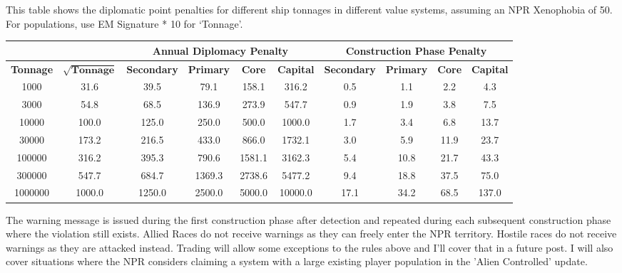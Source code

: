 \documentclass[../Aurora C# unofficial manual.tex]{subfiles}
\begin{document}
	This table shows the diplomatic point penalties for different ship tonnages in different value systems, assuming an NPR Xenophobia of 50. For populations, use EM Signature * 10 for ‘Tonnage’.
	\begin{center}
		\begin{tabular}{|c|c|c|c|c|c|c|c|c|c|}
			\hline
			\multicolumn{2}{|c}{}  & \multicolumn{4}{|c|}{\textbf{Annual Diplomacy Penalty}} & \multicolumn{4}{c|}{\textbf{Construction Phase Penalty}}  \\
			\hline
			\textbf{Tonnage} & \( \sqrt{\textbf{Tonnage}} \) & \textbf{Secondary} & \textbf{Primary} & \textbf{Core} & \textbf{Capital} & \textbf{Secondary} & \textbf{Primary} & \textbf{Core} & \textbf{Capital} \\
			\hline
			1000 & 31.6 & 39.5 & 79.1 & 158.1 & 316.2 & 0.5 & 1.1 & 2.2 & 4.3 \\
			\hline
			3000 & 54.8 & 68.5 & 136.9 & 273.9 & 547.7 & 0.9 & 1.9 & 3.8 & 7.5 \\
			\hline
			10000 & 100.0 & 125.0 & 250.0 & 500.0 & 1000.0 & 1.7 & 3.4 & 6.8 & 13.7 \\
			\hline
			30000 & 173.2 & 216.5 & 433.0 & 866.0 & 1732.1 & 3.0 & 5.9 & 11.9 & 23.7 \\
			\hline
			100000 & 316.2 & 395.3 & 790.6 & 1581.1 & 3162.3 & 5.4 & 10.8 & 21.7 & 43.3 \\
			\hline
			300000 & 547.7 & 684.7 & 1369.3 & 2738.6 & 5477.2 & 9.4 & 18.8 & 37.5 & 75.0 \\
			\hline
			1000000 & 1000.0 & 1250.0 & 2500.0 & 5000.0 & 10000.0 & 17.1 & 34.2 & 68.5 & 137.0 \\
			\hline
		\end{tabular}
	\end{center}
	
	The warning message is issued during the first construction phase after detection and repeated during each subsequent construction phase where the violation still exists. Allied Races do not receive warnings as they can freely enter the NPR territory. Hostile races do not receive warnings as they are attacked instead. Trading will allow some exceptions to the rules above and I'll cover that in a future post. I will also cover situations where the NPR considers claiming a system with a large existing player population in the 'Alien Controlled' update.
	
\end{document}
